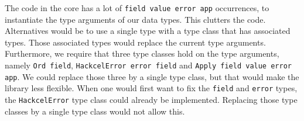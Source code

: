 \documentclass{article}
\begin{document}
	The code in the core has a lot of \texttt{field value error app} occurrences, to instantiate the type arguments of our data types. This clutters the code. Alternatives would be to use a single type with a type class that has associated types. Those associated types would replace the current type arguments. Furthermore, we require that three type classes hold on the type arguments, namely \texttt{Ord field}, \texttt{HackcelError error field} and \texttt{Apply field value error app}. We could replace those three by a single type class, but that would make the library less flexible. When one would first want to fix the \texttt{field} and \texttt{error} types, the \texttt{HackcelError} type class could already be implemented. Replacing those type classes by a single type class would not allow this.
	
	
	
\end{document}

